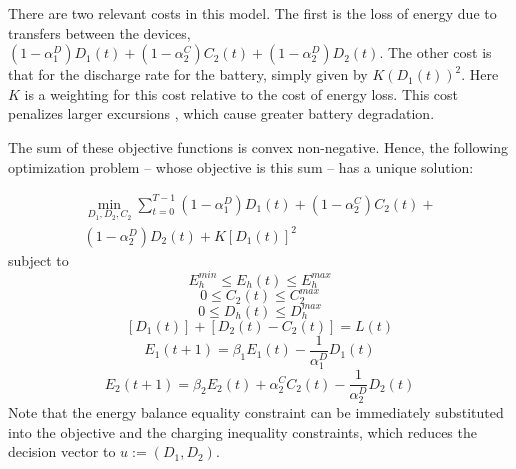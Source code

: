 \documentclass[conference]{IEEEtran}
\begin{document}
There are two relevant costs in this model. The first is the loss of energy due to transfers between the devices, $(1-\alpha_{1}^{D})D_{1}(t)+(1-\alpha_{2}^{C})C_{2}(t)+(1-\alpha_{2}^{D})D_{2}(t)$. The other cost is that for the discharge rate for the battery, simply given by $K(D_{1}(t))^{2}$. Here $K$ is a weighting for this cost relative to the cost of energy loss. This cost penalizes larger excursions \cite{bambang2014energy}, which cause greater battery degradation.

The sum of these objective functions is convex non-negative. Hence, the following optimization problem -- whose objective is this sum -- has a unique solution:

\begin{multline} \label{eq:initCostFnc}
    \min_{D_{1},D_{2},C_{2}} \sum_{t=0}^{T-1}
	(1-\alpha_{1}^{D})D_{1}(t)+
	(1-\alpha_{2}^{C})C_{2}(t)+\\
	(1-\alpha_{2}^{D})D_{2}(t)+
	K\left[D_{1}(t)\right]^{2}
\end{multline}
subject to
\begin{displaymath}E_{h}^{min}\leq E_{h}(t)\leq E_{h}^{max}\end{displaymath}
\begin{displaymath}0\leq C_{2}(t)\leq C_{2}^{max}\end{displaymath}
\begin{displaymath}0\leq D_{h}(t)\leq D_{h}^{max}\end{displaymath}
\begin{displaymath}\left[D_{1}(t)\right] + \left[D_{2}(t) - C_{2}(t)\right] = L(t)\end{displaymath}
\begin{displaymath}E_{1}(t+1)=\beta_{1}E_{1}(t)-\frac{1}{\alpha_{1}^{D}}D_{1}(t)\end{displaymath}
\begin{displaymath}E_{2}(t+1)=\beta_{2}E_{2}(t)+\alpha_{2}^{C}C_{2}(t)-\frac{1}{\alpha_{2}^{D}}D_{2}(t)\end{displaymath} Note that the energy balance equality constraint can be immediately substituted into the objective and the charging inequality constraints, which reduces the decision vector to $u:=(D_{1},D_{2})$.
\end{document}
